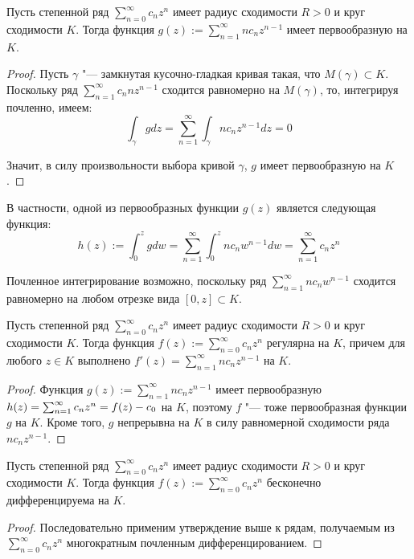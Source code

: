 \begin{corollary}
	Пусть степенной ряд $\sum_{n=0}^\infty c_nz^n$ имеет радиус сходимости $R > 0$ и круг сходимости $K$. Тогда функция $g(z) := \sum_{n = 1}^\infty nc_nz^{n-1}$ имеет первообразную на $K$.
\end{corollary}

\begin{proof}
	Пусть $\gamma$ "--- замкнутая кусочно-гладкая кривая такая, что $M(\gamma) \subset K$. Поскольку ряд $\sum_{n = 1}^\infty c_nnz^{n-1}$ сходится равномерно на $M(\gamma)$, то, интегрируя почленно, имеем:
	\[\int_\gamma gdz = \sum_{n = 1}^\infty \int_\gamma nc_nz^{n-1}dz = 0\]
	
	Значит, в силу произвольности выбора кривой $\gamma$, $g$ имеет первообразную на $K$.
\end{proof}

\begin{note}
	В частности, одной из первообразных функции $g(z)$ является следующая функция:
	\[h(z) := \int_0^zgdw = \sum_{n=1}^\infty \int_0^znc_nw^{n-1}dw = \sum_{n=1}^\infty c_nz^n\]
	
	Почленное интегрирование возможно, поскольку ряд $\sum_{n = 1}^\infty n c_nw^{n-1}$ сходится равномерно на любом отрезке вида $[0, z] \subset K$.
\end{note}

\begin{proposition}
	Пусть степенной ряд $\sum_{n=0}^\infty c_nz^n$ имеет радиус сходимости $R > 0$ и круг сходимости $K$. Тогда функция $f(z) := \sum_{n = 0}^\infty c_nz^{n}$ регулярна на $K$, причем для любого $z \in K$ выполнено $f'(z) = \sum_{n=1}^\infty nc_nz^{n-1}$ на $K$.
\end{proposition}

\begin{proof}
	Функция $g(z) := \sum_{n = 1}^\infty nc_nz^{n-1}$ имеет первообразную $h(z) = \sum_{n=1}^\infty c_nz^n \hm= f(z) - c_0$ на $K$, поэтому $f$ "--- тоже первообразная функции $g$ на $K$. Кроме того, $g$ непрерывна на $K$ в силу равномерной сходимости ряда $nc_nz^{n-1}$.
\end{proof}

\begin{corollary}
	Пусть степенной ряд $\sum_{n=0}^\infty c_nz^n$ имеет радиус сходимости $R > 0$ и круг сходимости $K$. Тогда функция $f(z) := \sum_{n = 0}^\infty c_nz^{n}$ бесконечно дифференцируема на $K$.
\end{corollary}

\begin{proof}
	Последовательно применим утверждение выше к рядам, получаемым из $\sum_{n=0}^\infty c_nz^n$ многократным почленным дифференцированием.
\end{proof}

